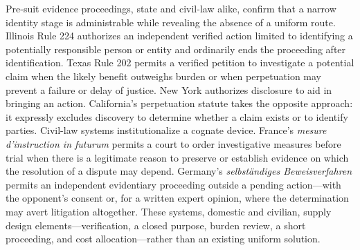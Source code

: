 Pre-suit evidence proceedings, state and civil-law alike, confirm that a narrow identity stage is administrable while revealing the absence of a uniform route. Illinois Rule 224 authorizes an independent verified action limited to identifying a potentially responsible person or entity and ordinarily ends the proceeding after identification. Texas Rule 202 permits a verified petition to investigate a potential claim when the likely benefit outweighs burden or when perpetuation may prevent a failure or delay of justice. New York authorizes disclosure to aid in bringing an action. California's perpetuation statute takes the opposite approach: it expressly excludes discovery to determine whether a claim exists or to identify parties. Civil-law systems institutionalize a cognate device. France's \emph{mesure d'instruction in futurum} permits a court to order investigative measures before trial when there is a legitimate reason to preserve or establish evidence on which the resolution of a dispute may depend. Germany's \emph{selbständiges Beweisverfahren} permits an independent evidentiary proceeding outside a pending action---with the opponent's consent or, for a written expert opinion, where the determination may avert litigation altogether. These systems, domestic and civilian, supply design elements---verification, a closed purpose, burden review, a short proceeding, and cost allocation---rather than an existing uniform solution.

